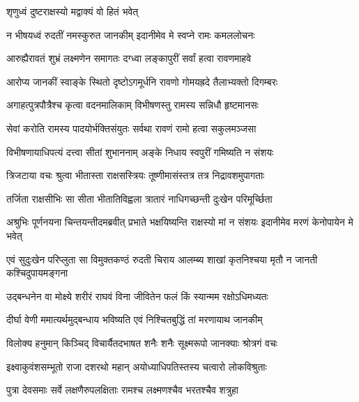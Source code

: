 \onelineshloka
{शृणुध्वं दुष्टराक्षस्यो मद्वाक्यं वो हितं भवेत्} %

\twolineshloka
{न भीषयध्वं रुदतीं नमस्कुरुत जानकीम्}
{इदानीमेव मे स्वप्ने रामः कमललोचनः} %

\twolineshloka
{आरुह्यैरावतं शुभ्रं लक्ष्मणेन समागतः}
{दग्ध्वा लङ्कापुरीं सर्वां हत्वा रावणमाहवे} %

\twolineshloka
{आरोप्य जानकीं स्वाङ्के स्थितो दृष्टोऽगमूर्धनि}
{रावणो गोमयह्रदे तैलाभ्यक्तो दिगम्बरः} %

\twolineshloka
{अगाहत्पुत्रपौत्रैश्च कृत्वा वदनमालिकाम्}
{विभीषणस्तु रामस्य सन्निधौ हृष्टमानसः} %

\twolineshloka
{सेवां करोति रामस्य पादयोर्भक्तिसंयुतः}
{सर्वथा रावणं रामो हत्वा सकुलमञ्जसा} %

\twolineshloka
{विभीषणायाधिपत्यं दत्त्वा सीतां शुभाननाम्}
{अङ्के निधाय स्वपुरीं गमिष्यति न संशयः} %

\twolineshloka
{त्रिजटाया वचः श्रुत्वा भीतास्ता राक्षसस्त्रियः}
{तूष्णीमासंस्तत्र तत्र निद्रावशमुपागताः} %

\twolineshloka
{तर्जिता राक्षसीभिः सा सीता भीतातिविह्वला}
{त्रातारं नाधिगच्छन्ती दुःखेन परिमूर्च्छिता} %

\threelineshloka
{अश्रुभिः पूर्णनयना चिन्तयन्तीदमब्रवीत्}
{प्रभाते भक्षयिष्यन्ति राक्षस्यो मां न संशयः}
{इदानीमेव मरणं केनोपायेन मे भवेत्} %

\fourlineindentedshloka
{एवं सुदुःखेन परिप्लुता सा}
{विमुक्तकण्ठं रुदती चिराय}
{आलम्ब्य शाखां कृतनिश्चया मृतौ}
{न जानती कश्चिदुपायमङ्गना} %






\twolineshloka
{उद्बन्धनेन वा मोक्ष्ये शरीरं राघवं विना}
{जीवितेन फलं किं स्यान्मम रक्षोऽधिमध्यतः} %

\twolineshloka
{दीर्घा वेणी ममात्यर्थमुद्बन्धाय भविष्यति}
{एवं निश्चितबुद्धिं तां मरणायाथ जानकीम्} %

\twolineshloka
{विलोक्य हनुमान् किञ्चिद् विचार्यैतदभाषत}
{शनैः शनैः सूक्ष्मरूपो जानक्याः श्रोत्रगं वचः} %

\twolineshloka
{इक्ष्वाकुवंशसम्भूतो राजा दशरथो महान्}
{अयोध्याधिपतिस्तस्य चत्वारो लोकविश्रुताः} %

\twolineshloka
{पुत्रा देवसमाः सर्वे लक्षणैरुपलक्षिताः}
{रामश्च लक्ष्मणश्चैव भरतश्चैव शत्रुहा} %

